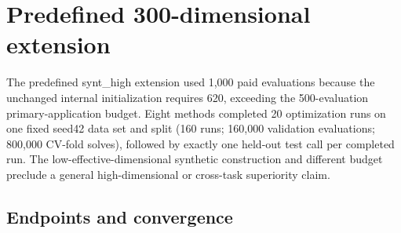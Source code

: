\documentclass[suppldata]{interact}
\begin{document}
\hypertarget{predefined-300-dimensional-extension}{%
\section{Predefined 300-dimensional extension}\label{predefined-300-dimensional-extension}}

The predefined synt\_\allowbreak high extension used 1,000 paid evaluations because the unchanged internal initialization requires 620, exceeding the 500-evaluation primary-application budget. Eight methods completed 20 optimization runs on one fixed seed42 data set and split (160 runs; 160,000 validation evaluations; 800,000 CV-fold solves), followed by exactly one held-out test call per completed run. The low-effective-dimensional synthetic construction and different budget preclude a general high-dimensional or cross-task superiority claim.

\hypertarget{endpoints-and-convergence}{%
\subsection{Endpoints and convergence}\label{endpoints-and-convergence}}

\FloatBarrier\begingroup\fontsize{8.5}{10.5}\selectfont\setlength\tabcolsep{3pt}
\end{document}
